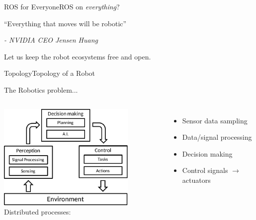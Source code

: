 \documentclass[aspectratio=169]{beamer}
\begin{document}
\begin{frame}{ROS for Everyone}{ROS on \textit{everything}?}
  \centering
  \begin{minipage}{0.6\textwidth}
  \begin{block}{}
    “Everything that moves will be robotic”
    \begin{flushright}\textit{- NVIDIA CEO Jensen Huang}\end{flushright}
  \end{block}
  \end{minipage}

  \vspace{1em}

  Let us keep the robot ecosystems free and open.

\end{frame}


\begin{frame}{Topology}{Topology of a Robot}
    \begin{block}{The Robotics problem...}
      \begin{columns}
          \includegraphics[width=6.6cm]{figures/topology.pdf}
          Distributed processes:
          \begin{itemize}
            \item Sensor data sampling
            \item Data/signal processing
            \item Decision making
            \item Control signals $\rightarrow$ actuators
          \end{itemize}
      \end{columns}
    \end{block}
  \end{frame}
\end{document}
